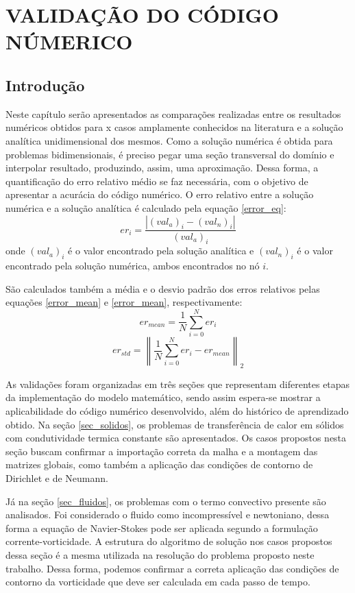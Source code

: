 \chapter{VALIDAÇÃO DO CÓDIGO NÚMERICO}
\label{validacao}
\section{\textbf{Introdução}}
Neste capítulo serão apresentados as comparações realizadas entre os resultados numéricos obtidos para x casos amplamente conhecidos na literatura e a solução analítica unidimensional dos mesmos.
Como a solução numérica é obtida para problemas bidimensionais, é preciso pegar uma seção transversal do domínio e interpolar  resultado, produzindo, assim, uma aproximação.
Dessa forma, a quantificação do erro relativo médio se faz necessária, com o objetivo de apresentar a acurácia do código numérico. O erro relativo entre a solução numérica e a solução analítica é calculado pela equação \eqref{error_eq}:
\begin{equation}
    er_i = \frac{|(val_a)_i - (val_n)_i|}{(val_a)_i}
    \label{error_eq} 
\end{equation}
onde $(val_a)_i$ é o valor encontrado pela solução analítica e $(val_n)_i$ é o valor encontrado pela solução numérica, ambos encontrados no nó $i$.

São calculados também a média e o desvio padrão dos erros relativos pelas equações \eqref{error_mean} e \eqref{error_mean}, respectivamente:
\begin{equation}
    er_{mean} = \frac{1}{N}\sum_{i=0}^{N} er_i
    \label{error_mean}
\end{equation}
\begin{equation}
    er_{std} = \left\| \frac{1}{N}\sum_{i=0}^{N} er_i-er_{mean} \right\|_2
    \label{error_std} 
\end{equation}

As validações foram organizadas em três seções que representam diferentes etapas da implementação do modelo matemático, sendo assim espera-se mostrar a aplicabilidade do código numérico desenvolvido, além do histórico de aprendizado obtido.
Na seção \ref{sec_solidos}, os problemas de transferência de calor em sólidos com condutividade termica constante são apresentados.
Os casos propostos nesta seção buscam confirmar a importação correta da malha e a montagem das matrizes globais, como também a aplicação das condições de contorno de Dirichlet e de Neumann.

Já na seção \ref{sec_fluidos}, os problemas com o termo convectivo presente são analisados.
Foi considerado o fluido como incompressível e newtoniano, dessa forma a equação de Navier-Stokes pode ser aplicada segundo a formulação corrente-vorticidade.
A estrutura do algoritmo de solução nos casos propostos dessa seção é a mesma utilizada na resolução do problema proposto neste trabalho.
Dessa forma, podemos confirmar a correta aplicação das condições de contorno da vorticidade que deve ser calculada em cada passo de tempo.

